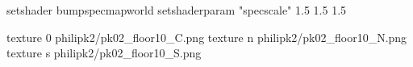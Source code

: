 setshader bumpspecmapworld
setshaderparam "specscale" 1.5 1.5 1.5

texture 0 philipk2/pk02_floor10_C.png
texture n philipk2/pk02_floor10_N.png
texture s philipk2/pk02_floor10_S.png

